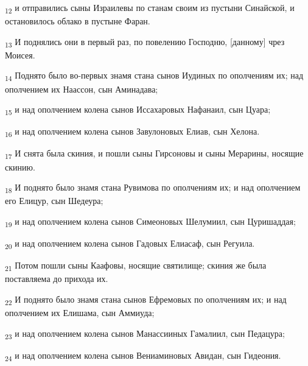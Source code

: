 \begin{tcolorbox}
\textsubscript{12} и отправились сыны Израилевы по станам своим из пустыни Синайской, и остановилось облако в пустыне Фаран.
\end{tcolorbox}
\begin{tcolorbox}
\textsubscript{13} И поднялись они в первый раз, по повелению Господню, [данному] чрез Моисея.
\end{tcolorbox}
\begin{tcolorbox}
\textsubscript{14} Поднято было во-первых знамя стана сынов Иудиных по ополчениям их; над ополчением их Наассон, сын Аминадава;
\end{tcolorbox}
\begin{tcolorbox}
\textsubscript{15} и над ополчением колена сынов Иссахаровых Нафанаил, сын Цуара;
\end{tcolorbox}
\begin{tcolorbox}
\textsubscript{16} и над ополчением колена сынов Завулоновых Елиав, сын Хелона.
\end{tcolorbox}
\begin{tcolorbox}
\textsubscript{17} И снята была скиния, и пошли сыны Гирсоновы и сыны Мерарины, носящие скинию.
\end{tcolorbox}
\begin{tcolorbox}
\textsubscript{18} И поднято было знамя стана Рувимова по ополчениям их; и над ополчением его Елицур, сын Шедеура;
\end{tcolorbox}
\begin{tcolorbox}
\textsubscript{19} и над ополчением колена сынов Симеоновых Шелумиил, сын Цуришаддая;
\end{tcolorbox}
\begin{tcolorbox}
\textsubscript{20} и над ополчением колена сынов Гадовых Елиасаф, сын Регуила.
\end{tcolorbox}
\begin{tcolorbox}
\textsubscript{21} Потом пошли сыны Каафовы, носящие святилище; скиния же была поставляема до прихода их.
\end{tcolorbox}
\begin{tcolorbox}
\textsubscript{22} И поднято было знамя стана сынов Ефремовых по ополчениям их; и над ополчением их Елишама, сын Аммиуда;
\end{tcolorbox}
\begin{tcolorbox}
\textsubscript{23} и над ополчением колена сынов Манассииных Гамалиил, сын Педацура;
\end{tcolorbox}
\begin{tcolorbox}
\textsubscript{24} и над ополчением колена сынов Вениаминовых Авидан, сын Гидеония.
\end{tcolorbox}
